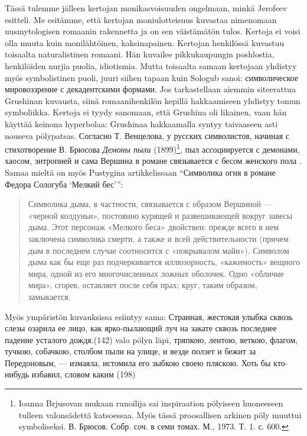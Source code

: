 \documentclass[12pt,a4paper]{article}
\begin{document}
Tässä tulemme jälleen kertojan monikasvoisuuden ongelmaan, minkä Jerofeev esitteli. Me esitämme, että kertojan moniulotteisuus kuvastaa nimenomaan uusmytologisen romaanin rakennetta ja on sen väistämätön tulos. Kertoja ei voisi olla muuta kuin monilähtöinen, kaksinapainen. Kertojan henkilössä kuvastuu toisaalta naturalistinen romaani. Hän kuvailee pikkukaupungin poshlostia, henkilöiden nurjia puolia, idiotismia. Mutta toisaalta samaan kertojaan yhdistyy myös symbolistinen puoli, juuri siihen tapaan kuin Sologub sanoi: символическое мировоззрение с декадентскими формами. Jos tarkastellaan aiemmin siteerattua Grushinan kuvausta, siinä romaanihenkilön kepillä hakkaamiseen yhdistyy tomun symboliikka. Kertoja ei tyydy sanomaan, että Grushina oli likainen, vaan hän käyttää keinona hyperbolaa: Grushinaa hakkaamalla syntyy taivaaseen asti nouseva pölypatsas. Согласно Т. Венцелова, у русских символистов, начиная с стихотворение В. Брюсова \emph{Демоны пыли} (1899)\footnote{Ioanna Brjusovan mukaan runoilija sai inspiraation pölyiseen huoneeseen tulleen valonsädettä katsoessaa. Myös tässä proosallisen arkinen pöly muuttui symboliseksi. В. Брюсов. Собр. соч. в семи томах. М., 1973. Т. 1. с. 600.}, пыл ассоциируется с демонами, хаосом, энтропией и сама Вершина в романе связывается с бесом женского пола \parencite[42--44]{venclova2012}. Samaa mieltä on myös Pustygina artikkelissaan \enquote{Символика огня в романе Федора Сологуба \enquote{Мелкий бес}}: \begin{quote}
Символика дыма, в частности, связывается с образом Вершиной — «черной колдуньи», постоянно курящей и развешивающей вокруг завесы дыма. Этот персонаж «Мелкого беса» двойствен: прежде всего в нем заключена символика смерти, а также и всей действительности (причем дым в последнем случае соотносится с «покрывалом майи»). Символом дыма как бы еще раз подчеркивается иллюзорность, «кажимость» вещного мира, одной из его многочисленных ложных оболочек. Одно «обличие мира», сгорев, оставляет после себя прах; круг, таким образом, замыкается.
\end{quote}

Myös ympäristön kuvauksissa esiintyy sama:
Странная, жестокая улыбка сквозь слезы озарила ее лицо, как 
ярко-пылающий луч на закате сквозь последнее падение усталого дождя.(142) valo pölyn läpi, 
тряпкою, лентою, веткою, флагом, тучкою, собачкою, столбом пыли на улице, и везде ползет и бежит за Передоновым, — измаяла, истомила его зыбкою своею пляскою. Хоть бы кто-нибудь избавил, словом каким (198)
\end{document}
